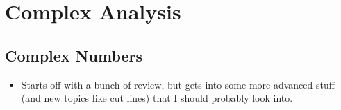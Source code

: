 \documentclass[../finalProject.tex]{subfiles}
\begin{document}
\section{Complex Analysis}\label{sch:7}
\subsection{Complex Numbers}
\begin{itemize}
    \item {}Starts off with a bunch of review, but gets into some more advanced stuff (and new topics like cut lines) that I should probably look into.
\end{itemize}
\end{document}
